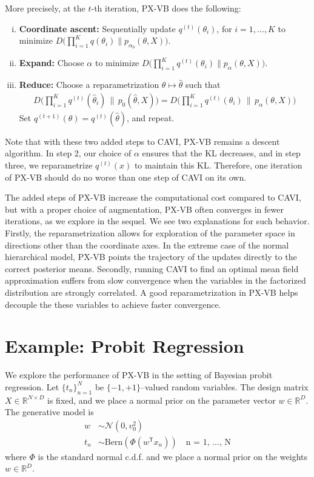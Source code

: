 \documentclass{article}
\begin{document}
More precisely, at the $t$-th iteration, PX-VB does the following: 
\begin{enumerate}[(i)]
\item {\bf Coordinate ascent:} Sequentially update $q^{(t)}(\theta_i)$, for $i=1,..., K$ to minimize $D\big( \prod_{i=1}^K q(\theta_i) \| p_{\alpha_0}(\theta, X) \big)$. 
\item {\bf Expand:} Choose $\alpha$ to minimize $D\big( \prod_{i=1}^K q^{(t)}(\theta_i) \| p_\alpha(\theta, X) \big)$.
\item {\bf Reduce:} Choose a reparametrization $\theta \mapsto \hat\theta$ such that
\begin{align*}
D\Big( \prod_{i=1}^K q^{(t)}(\hat\theta_i) \,\big\|\, p_{0}(\hat\theta, X) \Big) = D\Big( \prod_{i=1}^K q^{(t)}(\theta_i) \,\big\|\, p_\alpha(\theta, X) \Big)
\end{align*}
Set $q^{(t+1)}(\theta) = q^{(t)}(\hat\theta)$, and repeat. 
\end{enumerate}


Note that with these two added steps to CAVI, PX-VB remains a descent algorithm. In step 2, our choice of $\alpha$ ensures that the KL decreases, and in step three, we reparametrize $q^{(t)}(x)$ to maintain this KL. Therefore, one iteration of PX-VB should do no worse than one step of CAVI on its own. 

The added steps of PX-VB increase the computational cost compared to CAVI, but with a proper choice of augmentation,  PX-VB often converges in fewer iterations, as we explore in the sequel. We see two explanations for such behavior. Firstly, the reparametrization allows for exploration of the parameter space in directions other than the coordinate axes. In the extreme case of the normal hierarchical model, PX-VB points the trajectory of the updates directly to the correct posterior means. Secondly, running CAVI to find an optimal mean field approximation suffers from slow convergence when the variables in the factorized distribution are strongly correlated. A good reparametrization in PX-VB helps decouple the these variables to achieve faster convergence. 




\section{Example: Probit Regression}
\label{probit}

We explore the performance of PX-VB in the setting of Bayesian probit regression. Let $\{t_n\}_{n=1}^N$ be $\{-1,+1\}$--valued random variables. The design matrix $X\in\mathbb R^{N\times D}$ is fixed, and we place a normal prior on the parameter vector $w\in\mathbb R^D$. The generative model is
\begin{align*}
w &\sim \mathcal N (0, v_0^2) \\
t_n &\sim \text{Bern}(\Phi(w^\mathsf T x_n))\quad \text{n = 1, ..., N}
\end{align*}
where $\Phi$ is the standard normal c.d.f. and we place a normal prior on the weights $w\in\mathbb R^D$. 
\end{document}
